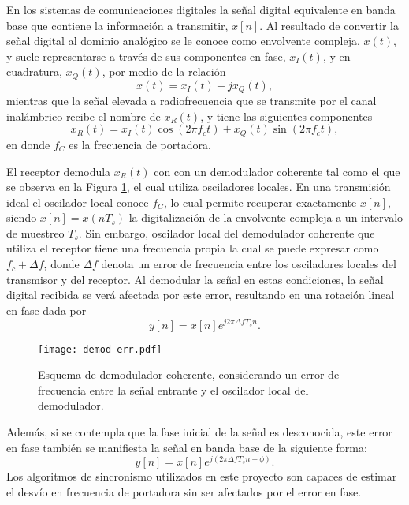 En los sistemas de comunicaciones digitales la señal digital equivalente en banda base que contiene la información a transmitir, $x[n]$. Al resultado de convertir la señal digital al dominio analógico se le conoce como envolvente compleja, $x(t)$, y suele representarse a través de sus componentes en fase, $x_I(t)$, y en cuadratura, $x_Q(t)$, por medio de la relación
\begin{equation}
    x(t) = x_I(t)+jx_Q(t),
\end{equation}
mientras que la señal elevada a radiofrecuencia que se transmite por el canal inalámbrico recibe el nombre de $x_R(t)$, y tiene las siguientes componentes
\begin{equation}
    x_R(t) = x_I(t)\cos(2\pi f_c t) + x_Q(t)\sin(2\pi f_c t),
\end{equation}
en donde $f_C$ es la frecuencia de portadora.

El receptor demodula $x_R(t)$ con con un demodulador coherente tal como el que se observa en la Figura \ref{fig:demod-err}, el cual utiliza osciladores locales. En una transmisión ideal el oscilador local conoce $f_C$, lo cual permite recuperar exactamente $x[n]$, siendo $x[n]=x(nT_s)$ la digitalización de la envolvente compleja a un intervalo de muestreo $T_s$. Sin embargo, oscilador local del demodulador coherente que utiliza el receptor tiene una frecuencia propia la cual se puede expresar como $f_c+\Delta f$, donde $\Delta f$ denota un error de frecuencia entre los osciladores locales del transmisor y del receptor. Al demodular la señal en estas condiciones, la señal digital recibida se verá afectada por este error, resultando en una rotación lineal en fase dada por
\begin{equation}
    y[n] = x[n] e^{j2\pi\Delta f T_s n}.
\end{equation}

\begin{figure}[t]
    \centering{}\texttt{[image: demod-err.pdf]}
    \caption{Esquema de demodulador coherente, considerando un error de frecuencia entre la señal entrante y el oscilador local del demodulador.\label{fig:demod-err}}  
\end{figure}

Además, si se contempla que la fase inicial de la señal es desconocida, este error en fase también se manifiesta la señal en banda base de la siguiente forma:
\begin{equation}
    y[n] = x[n] e^{j(2\pi\Delta f T_s n+\phi)}.
\end{equation}
Los algoritmos de sincronismo utilizados en este proyecto son capaces de estimar el desvío en frecuencia de portadora sin ser afectados por el error en fase.


